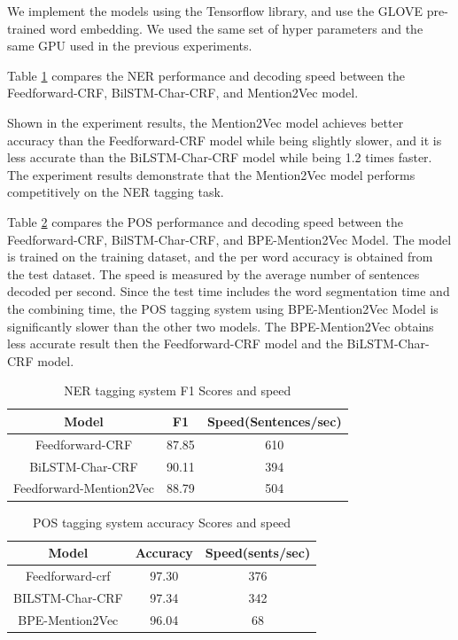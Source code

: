 \documentclass{sfuthesis}
\begin{document}
We implement the models using the Tensorflow library, and use the GLOVE pre-trained word embedding. We used the same set of hyper parameters and the same GPU used in the previous experiments. 

Table \ref{table:ner-mention2vec} compares the NER performance and decoding speed between the Feedforward-CRF, BilSTM-Char-CRF, and Mention2Vec model.

Shown in the experiment results, the Mention2Vec model achieves better accuracy than the Feedforward-CRF model while being slightly slower, and it is less accurate than the BiLSTM-Char-CRF model while being 1.2 times faster. The experiment results demonstrate that the Mention2Vec model performs competitively on the NER tagging task.

Table \ref{table:pos-mention2vec} compares the POS performance and decoding speed between the Feedforward-CRF, BilSTM-Char-CRF, and BPE-Mention2Vec Model. The model is trained on the training dataset, and the per word accuracy is obtained from the test dataset. The speed is measured by the average number of sentences decoded per second. Since the test time includes the word segmentation time and the combining time, the POS tagging system using BPE-Mention2Vec Model is significantly slower than the other two models. The BPE-Mention2Vec obtains less accurate result then the Feedforward-CRF model and the BiLSTM-Char-CRF model. 

\begin{table}[]
\centering
\caption{NER tagging system F1 Scores and speed }
\label{table:ner-mention2vec}
\begin{tabular}{|c|c|c|}
\hline
Model            & F1     & Speed(Sentences/sec)        \\ \hline
Feedforward-CRF  & 87.85  & 610                     \\ \hline
BiLSTM-Char-CRF & 90.11  & 394                     \\ \hline
Feedforward-Mention2Vec      & 88.79  & 504                     \\ \hline
\end{tabular}
\end{table}

\begin{table}[]
\centering
\caption{POS tagging system accuracy Scores and speed}
\label{table:pos-mention2vec}
\begin{tabular}{|c|c|c|}
\hline
Model            & Accuracy     & Speed(sents/sec)        \\ \hline
Feedforward-crf  & 97.30  & 376                     \\ \hline
BILSTM-Char-CRF & 97.34  & 342                    \\ \hline
BPE-Mention2Vec      & 96.04  & 68                    \\ \hline
\end{tabular}
\end{table}
\end{document}

